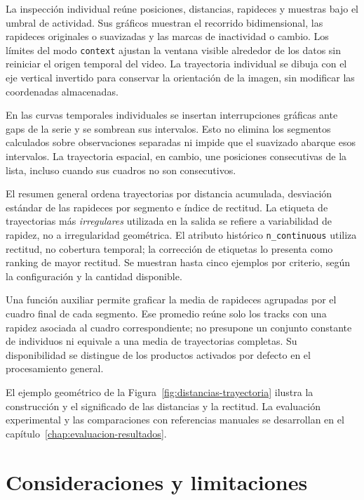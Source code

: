 La inspección individual reúne posiciones, distancias, rapideces y muestras bajo el umbral de actividad. Sus gráficos muestran el recorrido bidimensional, las rapideces originales o suavizadas y las marcas de inactividad o cambio. Los límites del modo \texttt{context} ajustan la ventana visible alrededor de los datos sin reiniciar el origen temporal del video. La trayectoria individual se dibuja con el eje vertical invertido para conservar la orientación de la imagen, sin modificar las coordenadas almacenadas.

En las curvas temporales individuales se insertan interrupciones gráficas ante gaps de la serie y se sombrean sus intervalos. Esto no elimina los segmentos calculados sobre observaciones separadas ni impide que el suavizado abarque esos intervalos. La trayectoria espacial, en cambio, une posiciones consecutivas de la lista, incluso cuando sus cuadros no son consecutivos.

El resumen general ordena trayectorias por distancia acumulada, desviación estándar de las rapideces por segmento e índice de rectitud. La etiqueta de trayectorias más \emph{irregulares} utilizada en la salida se refiere a variabilidad de rapidez, no a irregularidad geométrica. El atributo histórico \texttt{n\_continuous} utiliza rectitud, no cobertura temporal; la corrección de etiquetas lo presenta como ranking de mayor rectitud. Se muestran hasta cinco ejemplos por criterio, según la configuración y la cantidad disponible.

Una función auxiliar permite graficar la media de rapideces agrupadas por el cuadro final de cada segmento. Ese promedio reúne solo los tracks con una rapidez asociada al cuadro correspondiente; no presupone un conjunto constante de individuos ni equivale a una media de trayectorias completas. Su disponibilidad se distingue de los productos activados por defecto en el procesamiento general.

\begin{samepage}
El ejemplo geométrico de la Figura~\ref{fig:distancias-trayectoria} ilustra la construcción y el significado de las distancias y la rectitud. La evaluación experimental y las comparaciones con referencias manuales se desarrollan en el capítulo~\ref{chap:evaluacion-resultados}.
\par
\end{samepage}

\section{Consideraciones y limitaciones}

